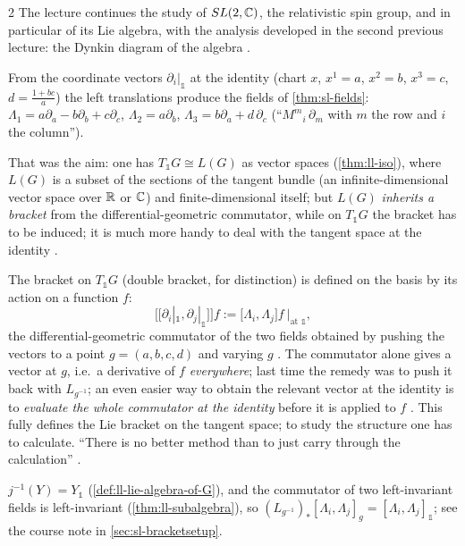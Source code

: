 \begin{paracol}{2}
The lecture continues the study of $SL(2,\mathbb{C})$, the relativistic spin group, and in particular of its Lie algebra, with the analysis developed in the second previous lecture: the Dynkin diagram of the algebra  .
\begin{recall}
From the coordinate vectors $\partial_i|_{\mathbb 1}$ at the identity (chart $x$, $x^1=a$, $x^2=b$, $x^3=c$, $d=\frac{1+bc}{a}$) the left translations produce the fields of \cref{thm:sl-fields}: $\Lambda_1=a\partial_a-b\partial_b+c\partial_c$, $\Lambda_2=a\partial_b$, $\Lambda_3=b\partial_a+d\,\partial_c$ (``$M^m{}_i\,\partial_m$ with $m$ the row and $i$ the column'').
\end{recall}
That was the aim: one has $T_{\mathbb 1}G\cong L(G)$ as vector spaces (\cref{thm:ll-iso}), where $L(G)$ is a subset of the sections of the tangent bundle (an infinite-dimensional vector space over $\mathbb{R}$ or $\mathbb{C}$) and finite-dimensional itself; but $L(G)$ \emph{inherits a bracket} from the differential-geometric commutator, while on $T_{\mathbb 1}G$ the bracket has to be induced; it is much more handy to deal with the tangent space at the identity           .

The bracket on $T_{\mathbb 1}G$ (double bracket, for distinction) is defined on the basis by its action on a function $f$:
\[
  \bigl[\!\bigl[\partial_i|_{\mathbb 1},\partial_j|_{\mathbb 1}\bigr]\!\bigr]f:=\bigl[\Lambda_i,\Lambda_j\bigr]f\ \Big|_{\text{at }\mathbb 1},
\]
the differential-geometric commutator of the two fields obtained by pushing the vectors to a point $g=(a,b,c,d)$ and varying $g$    . The commutator alone gives a vector at $g$, i.e.\ a derivative of $f$ \emph{everywhere}; last time the remedy was to push it back with $L_{g^{-1}}$; an even easier way to obtain the relevant vector at the identity is to \emph{evaluate the whole commutator at the identity} before it is applied to $f$  . This fully defines the Lie bracket on the tangent space; to study the structure one has to calculate. ``There is no better method than to just carry through the calculation'' .
\begin{recall}
$j^{-1}(Y)=Y_{\mathbb 1}$ (\cref{def:ll-lie-algebra-of-G}), and the commutator of two left-invariant fields is left-invariant (\cref{thm:ll-subalgebra}), so $(L_{g^{-1}})_*[\Lambda_i,\Lambda_j]_g=[\Lambda_i,\Lambda_j]_{\mathbb 1}$; see the course note in \cref{sec:sl-bracketsetup}.
\end{recall}


\end{paracol}
